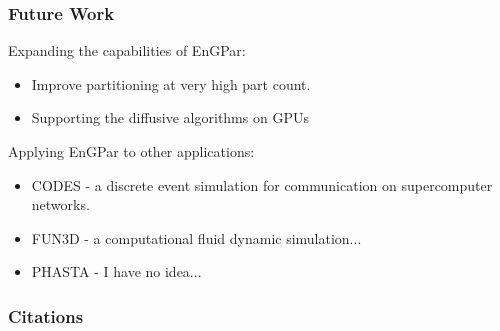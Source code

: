 \documentclass{beamer}
\begin{document}
\begin{frame}
  \frametitle{Future Work}
  Expanding the capabilities of EnGPar:
  \begin{itemize}
    \item Improve partitioning at very high part count.
  \item Supporting the diffusive algorithms on GPUs
  \end{itemize}
  Applying EnGPar to other applications:
  \begin{itemize}
  \item CODES - a discrete event simulation for communication on supercomputer networks.
  \item FUN3D - a computational fluid dynamic simulation...
  \item PHASTA - I have no idea...
  \end{itemize}
\end{frame}

\begin{frame}
  \frametitle{Citations}
\end{frame}
  
\end{document}
